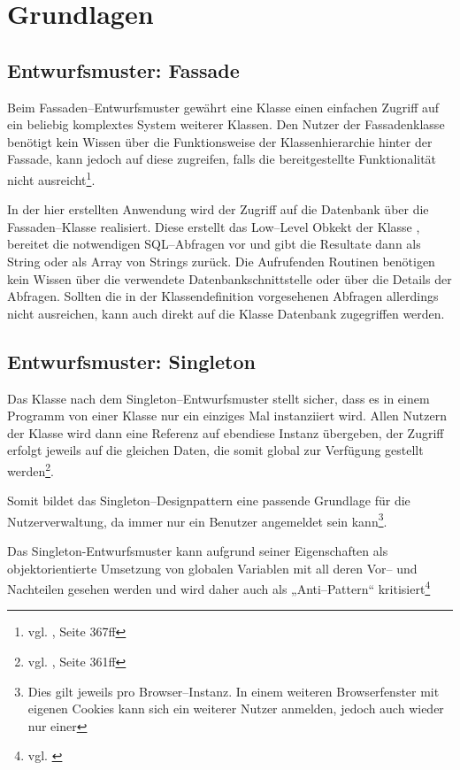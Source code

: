 \section{Grundlagen}
\label{sec:grundlagen}
\subsection{Entwurfsmuster: Fassade}

Beim Fassaden--Entwurfsmuster gewährt eine Klasse einen einfachen Zugriff auf ein beliebig komplextes System weiterer Klassen. Den Nutzer der Fassadenklasse benötigt kein Wissen über die Funktionsweise der Klassenhierarchie hinter der Fassade, kann jedoch auf diese zugreifen, falls die bereitgestellte Funktionalität nicht ausreicht\footnote{vgl. \cite{Balzert}, Seite 367ff}.

In der hier erstellten Anwendung wird der Zugriff auf die Datenbank über die Fassaden--Klasse  realisiert. Diese erstellt das Low--Level Obkekt der Klasse , bereitet die notwendigen SQL--Abfragen vor und gibt die Resultate dann als String oder als Array von Strings zurück. Die Aufrufenden Routinen benötigen kein Wissen über die verwendete Datenbankschnittstelle oder über die Details der Abfragen. Sollten die in der Klassendefinition vorgesehenen Abfragen allerdings nicht ausreichen, kann auch direkt auf die Klasse Datenbank zugegriffen werden.

\subsection{Entwurfsmuster: Singleton}

Das Klasse nach dem Singleton--Entwurfsmuster stellt sicher, dass es in einem Programm von einer Klasse nur ein einziges Mal instanziiert wird. Allen Nutzern der Klasse wird dann eine Referenz auf ebendiese Instanz übergeben, der Zugriff erfolgt jeweils auf die gleichen Daten, die somit global zur Verfügung gestellt werden\footnote{vgl. \cite{Balzert}, Seite 361ff}.

Somit bildet das Singleton--Designpattern eine passende Grundlage für die Nutzerverwaltung, da immer nur ein Benutzer angemeldet sein kann\footnote{Dies gilt jeweils pro Browser--Instanz. In einem weiteren Browserfenster mit eigenen Cookies kann sich ein weiterer Nutzer anmelden, jedoch auch wieder nur einer}.

Das Singleton-Entwurfsmuster kann aufgrund seiner Eigenschaften als objektorientierte Umsetzung von globalen Variablen mit all deren Vor-- und Nachteilen gesehen werden und wird daher auch als „Anti--Pattern“ kritisiert\footnote{vgl. \cite{Hauer:singleton}}

